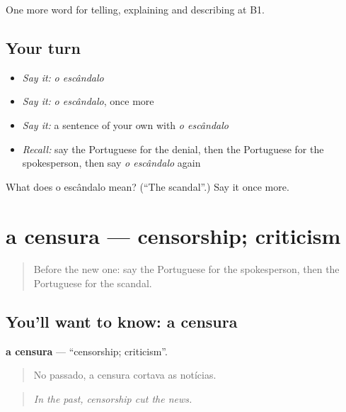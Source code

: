 \begin{grammarlens}[title={What you've built}]
One more word for telling, explaining and describing at B1.
\end{grammarlens}

\subsection*{Your turn}
\begin{itemize}
\raggedright
  \item \emph{Say it:} \emph{o escândalo}
  \item \emph{Say it:} \emph{o escândalo}, once more
  \item \emph{Say it:} a sentence of your own with \emph{o escândalo}
  \item \emph{Recall:} say the Portuguese for the denial, then the Portuguese for the spokesperson, then say \emph{o escândalo} again
\end{itemize}

\begin{tcolorbox}[breakable,colback=teal!4,colframe=teal!35!black,title={Before you move on}]
What does o escândalo mean? (\textquotedblleft{}The scandal\textquotedblright{}.) Say it once more.
\end{tcolorbox}
\section[a censura]{a censura — censorship; criticism}

\label{lesson:PT-C284-censura}



\begin{quote}
Before the new one: say the Portuguese for the spokesperson, then the Portuguese for the scandal.
\end{quote}

\subsection*{You'll want to know: a censura}
\textbf{a censura} — \textquotedblleft{}censorship; criticism\textquotedblright{}.

\begin{quote}
No passado, a censura cortava as notícias.
\end{quote}

\begin{quote}
\emph{In the past, censorship cut the news.}
\end{quote}


